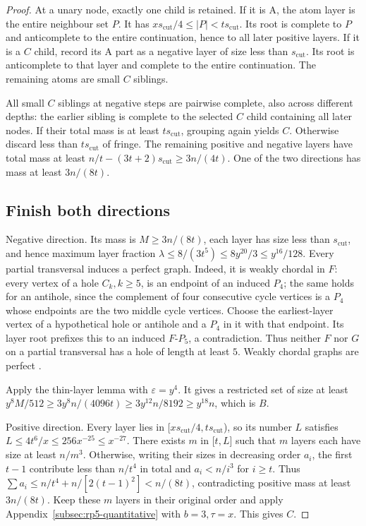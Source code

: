 \documentclass[11pt,a4paper]{article}
\theoremstyle{definition}
\theoremstyle{remark}
\numberwithin{equation}{section}
\begin{document}
\begin{proof}
At a unary node, exactly one child is retained. If it is A, the atom layer is the entire neighbour set \(P\). It has \(xs_{\mathrm{cut}}/4\le\allowbreak |P|<ts_{\mathrm{cut}}\). Its root is complete to \(P\) and anticomplete to the entire continuation, hence to all later positive layers. If it is a \(C\) child, record its A part as a negative layer of size less than \(s_{\mathrm{cut}}\). Its root is anticomplete to that layer and complete to the entire continuation. The remaining atoms are small \(C\) siblings.

All small \(C\) siblings at negative steps are pairwise complete, also across different depths: the earlier sibling is complete to the selected \(C\) child containing all later nodes. If their total mass is at least \(ts_{\mathrm{cut}}\), grouping again yields \(C\). Otherwise discard less than \(ts_{\mathrm{cut}}\) of fringe. The remaining positive and negative layers have total mass at least \(n/t-(3t+2)s_{\mathrm{cut}}\ge\allowbreak 3n/(4t)\). One of the two directions has mass at least \(3n/(8t)\).
\subsection{Finish both directions}\label{subsec:rp5-directions}
Negative direction. Its mass is \(M\ge\allowbreak 3n/(8t)\), each layer has size less than \(s_{\mathrm{cut}}\), and hence maximum layer fraction \(\lambda\le\allowbreak 8/(3t^{5})\le\allowbreak 8y^{20}/3\le\allowbreak y^{16}/128\). Every partial transversal induces a perfect graph. Indeed, it is weakly chordal in \(F\): every vertex of a hole \(C_{k},\allowbreak  k\ge\allowbreak 5\), is an endpoint of an induced \(P_{4}\); the same holds for an antihole, since the complement of four consecutive cycle vertices is a \(P_{4}\) whose endpoints are the two middle cycle vertices. Choose the earliest-layer vertex of a hypothetical hole or antihole and a \(P_{4}\) in it with that endpoint. Its layer root prefixes this to an induced \(F\text{-}P_{5}\), a contradiction. Thus neither \(F\) nor \(G\) on a partial transversal has a hole of length at least \(5\). Weakly chordal graphs are perfect \cite{hayward}.

Apply the thin-layer lemma with \(\varepsilon=y^{4}\). It gives a restricted set of size at least \(y^{8} M/512\ge\allowbreak 3y^{8} n/(4096t)\ge\allowbreak 3y^{12} n/8192\ge\allowbreak y^{18} n\), which is \(B\).

Positive direction. Every layer lies in [\(xs_{\mathrm{cut}}/4,\allowbreak ts_{\mathrm{cut}}\)), so its number \(L\) satisfies \(L\le\allowbreak 4t^{6}/x\le\allowbreak 256x^{-25}\le\allowbreak x^{-27}\). There exists \(m\) in [\(t,\allowbreak L\)] such that \(m\) layers each have size at least \(n/m^{3}\). Otherwise, writing their sizes in decreasing order \(a_{i}\), the first \(t-1\) contribute less than \(n/t^{4}\) in total and \(a_{i}<n/i^{3}\) for \(i\ge\allowbreak t\). Thus \(\sum  a_{i}\le n/t^{4}+n/[2(t-1)^{2}]<n/(8t)\), contradicting positive mass at least \(3n/(8t)\). Keep these \(m\) layers in their original order and apply Appendix~\ref{subsec:rp5-quantitative} with \(b=3,\allowbreak \tau=x\). This gives \(C\).

\end{proof}
\end{document}
